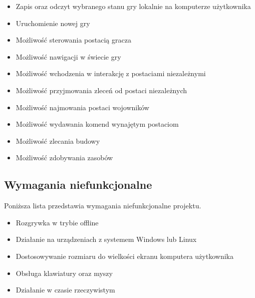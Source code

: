 \begin{itemize}\label{list:fun}
  \item Zapis oraz odczyt wybranego stanu gry lokalnie na komputerze użytkownika
  \item Uruchomienie nowej gry
  \item Możliwość sterowania postacią gracza
  \item Możliwość nawigacji w świecie gry
  \item Możliwość wchodzenia w interakcję z postaciami niezależnymi
  \item Możliwość przyjmowania zleceń od postaci niezależnych
  \item Możliwość najmowania postaci wojowników
  \item Możliwość wydawania komend wynajętym postaciom
  \item Możliwość zlecania budowy
  \item Możliwość zdobywania zasobów
\end{itemize}

\subsection{Wymagania niefunkcjonalne}\label{ss:nonfun}
Poniższa lista przedstawia wymagania niefunkcjonalne projektu.

\begin{itemize}\label{list:nonfun}
  \item Rozgrywka w trybie offline
  \item Działanie na urządzeniach z systemem Windows lub Linux
  \item Dostosowywanie rozmiaru do wielkości ekranu komputera użytkownika
  \item Obsługa klawiatury oraz myszy
  \item Działanie w czasie rzeczywistym
\end{itemize}

